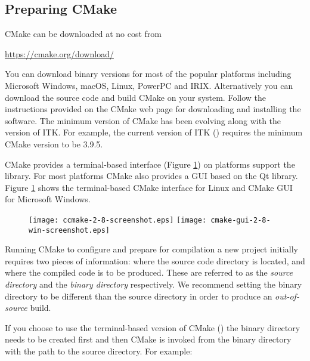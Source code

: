 \subsection{Preparing CMake}
\label{sec:CMakeforITK}


CMake can be downloaded at no cost from
\begin{center}
  \url{https://cmake.org/download/}
\end{center}

You can download binary versions for most of the popular platforms including
Microsoft Windows, macOS, Linux, PowerPC and IRIX. Alternatively you can
download the source code and build CMake on your system. Follow the instructions
provided on the CMake web page for downloading and installing the software. The
minimum version of CMake has been evolving along with the version of ITK. For
example, the current version of ITK (\ITKVERSIONMAJORMINORPATCH) requires the minimum
CMake version to be 3.9.5.

CMake provides a terminal-based interface (Figure \ref{fig:CMakeGUI})
on platforms support the  library. For most platforms CMake also
provides a GUI based on the Qt library. Figure \ref{fig:CMakeGUI} shows the
terminal-based CMake interface for Linux and CMake GUI for Microsoft Windows.

\begin{figure}[htb!]
\centering
\texttt{[image: ccmake-2-8-screenshot.eps]}
\texttt{[image: cmake-gui-2-8-win-screenshot.eps]}
\label{fig:CMakeGUI}
\end{figure}

Running CMake to configure and prepare for compilation a new project initially
requires two pieces of information: where the source code directory is located,
and where the compiled code is to be produced. These are referred to as the
\emph{source directory} and the \emph{binary directory} respectively.
We recommend setting the binary directory to be different than the source
directory in order to produce an \emph{out-of-source} build.

If you choose to use the terminal-based version of CMake () the
binary directory needs to be created first and then CMake is invoked from the
binary directory with the path to the source directory. For example:

